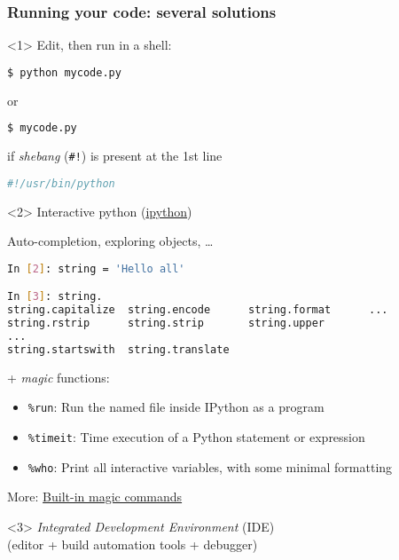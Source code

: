 \begin{frame}[fragile, c]
\frametitle{Running your code: several solutions}

\begin{onlyenv}<1> 
Edit, then run in a shell:
\begin{lstlisting}[language=bash]
$ python mycode.py
\end{lstlisting}
or 
\begin{lstlisting}[language=bash]
$ mycode.py
\end{lstlisting}
if \textit{shebang} (\verb|#!|) is present at the 1st line
\begin{lstlisting}[language=python]
#!/usr/bin/python
\end{lstlisting}
\end{onlyenv}

\begin{onlyenv}<2> 
Interactive python (\href{http://ipython.org/}{ipython})

Auto-completion, exploring objects, \ldots

\begin{lstlisting}[language=bash]
In [2]: string = 'Hello all'

In [3]: string.
string.capitalize  string.encode      string.format      ...
string.rstrip      string.strip       string.upper       
... 
string.startswith  string.translate   
\end{lstlisting}

+ \textit{magic} functions:

{\footnotesize
\begin{itemize}
\item[] \verb|%run|: Run the named file inside IPython as a program\\
\item[] \verb|%timeit|: Time execution of a Python statement or expression\\
\item[] \verb|%who|: Print all interactive variables, with some minimal formatting
\end{itemize}
}
\vfill

More: \href{http://ipython.readthedocs.org/en/stable/interactive/magics.html?highlight=magic#built-in-magic-commands}{Built-in magic commands}
\end{onlyenv}


\begin{onlyenv}<3> 
\textit{Integrated Development Environment} (IDE)\\
(editor + build automation tools + debugger)


\end{onlyenv}
\end{frame}
